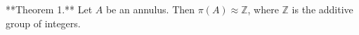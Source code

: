 **Theorem 1.** Let $A$ be an annulus. Then $\pi(A) \approx \mathbb{Z}$, where $\mathbb{Z}$ is the additive group of integers.
